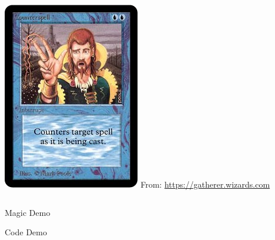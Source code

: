 \documentclass{beamer}
\begin{document}
\begin{frame}
\begin{columns}
\begin{column}{.5\textwidth}
{                    \includegraphics[width=\textwidth] {./img/counterspell/main.jpg}
                }
                \tiny{From: \url{https://gatherer.wizards.com}}
            \end{column}
        \end{columns}
    \end{frame}

    \begin{frame}
        \begin{center}
            \Huge
            Magic Demo
        \end{center}
    \end{frame}

    \begin{frame}
        \begin{center}
            \Huge
            Code Demo
        \end{center}
    \end{frame}
\end{document}
